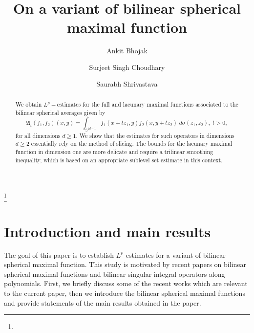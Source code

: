 \documentclass[a4paper,reqno]{amsart}
\theoremstyle{definition}
\theoremstyle{remark}
\numberwithin{equation}{section}
\begin{document}
	\title{On a variant of bilinear spherical maximal function}
	
	\author[Bhojak]{Ankit Bhojak}
	\address{Ankit Bhojak\\
		Department of Mathematics\\
		Indian Institute of Science Education and Research Bhopal\\
		Bhopal-462066, India.}
	
	\author[Choudhary]{Surjeet Singh Choudhary}
	\address{Surjeet Singh Choudhary\\
		Department of Mathematical Sciences\\
		Indian Institute of Science Education and Research Mohali\\
		Mohali-140306, India.}
	
	\author[Shrivastava]{Saurabh Shrivastava}
	\address{Saurabh Shrivastava\\
		Department of Mathematics\\
		Indian Institute of Science Education and Research Bhopal\\
		Bhopal-462066, India.}
	
	\thanks{}
	\begin{abstract} We obtain $L^p-$estimates for the full and lacunary maximal functions associated to the bilinear spherical averages given by
			\[\mathfrak{A}_t(f_1,f_2)(x,y)=\int_{\mathbb S^{2d-1}}f_1(x+tz_1,y)f_2(x,y+tz_2)\;d\sigma(z_1,z_2),\;t>0,\]
			for all dimensions $d\geq1$. We show that the estimates for such operators in dimensions $d\geq2$ essentially rely on the method of slicing. The bounds for the lacunary maximal function in dimension one are more delicate and require a trilinear smoothing inequality, which is based on an appropriate sublevel set estimate in this context.
	\end{abstract}
	\maketitle
	
	\section{Introduction and main results}
	The goal of this paper is to establish $L^p$-estimates for a variant of bilinear spherical maximal function. This study is motivated by recent papers on bilinear spherical maximal functions and bilinear singular integral operators along polynomials. First, we briefly discuss some of the recent works which are relevant to the current paper, then we introduce the bilinear spherical maximal functions and provide statements of the main results obtained in the paper. 
	
\end{document}
